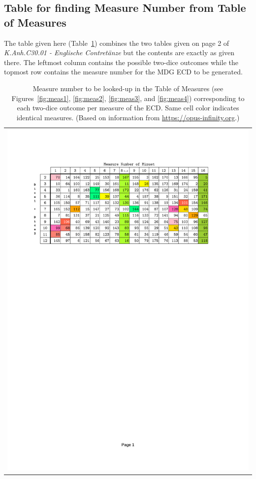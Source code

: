 \documentclass[letterpaper,x11names,svgnames,10pt]{article}
\begin{document}
\subsection{Table for finding Measure Number from Table of Measures}\label{tableFind}
The table given here (Table~\ref{fig:0tab1}) combines the two tables given on page 2 of {\it K.Anh.C30.01 - Englische Contret\"{a}nze} but the contents are exactly as given there.  The leftmost column contains the possible two-dice outcomes while the topmost row contains the measure number for the MDG ECD to be generated.

\begin{table}[H]
	\centering
	\begin{tabular}{c}
		\centering
		\includegraphics[clip=true,trim=0.90in 7.75in 1.25in 1.00in,scale=0.90]{0TAB1ECc}
	\end{tabular}
	\caption{Measure number to be looked-up in the Table of Measures (see Figures~\ref{fig:meas1}, \ref{fig:meas2}, \ref{fig:meas3}, and \ref{fig:meas4}) corresponding to each two-dice outcome per measure of the ECD. Same cell color indicates identical measures. (Based on information from \href{https://opus-infinity.org/dice_games/mozart_contredanse/tables/}{https://opus-infinity.org}.)}
	\label{fig:0tab1}
\end{table}
\end{document}
